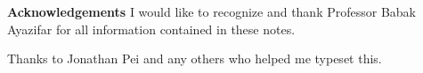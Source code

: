{\textbf{Acknowledgements}}
I would like to recognize and thank Professor Babak Ayazifar for all information contained in these notes. 

Thanks to Jonathan Pei and any others who helped me typeset this.
